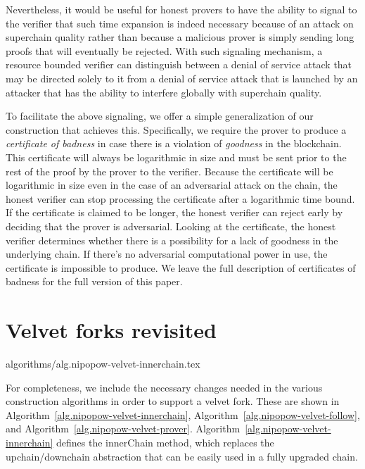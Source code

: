 %
Nevertheless, it would be useful for honest provers to have the ability to
signal to the verifier that such time expansion is indeed necessary because of
an attack on superchain quality rather than because a malicious prover is simply
sending long proofs that will eventually be rejected. With such signaling
mechanism, a resource bounded verifier can distinguish between a denial of
service attack that may be directed solely to it from  a denial of service
attack that  is launched by an attacker that has the ability to  interfere
globally with superchain quality.

To facilitate the above signaling, we offer a simple generalization of our
construction that achieves this.
Specifically, we require the prover to produce a \textit{certificate of badness}
in case there is a violation of \textit{goodness} in the blockchain. This
certificate will always be logarithmic in size and must be sent prior to the
rest of the proof by the prover to the verifier. Because the certificate will be
logarithmic in size even in the case of an adversarial attack on the chain, the
honest verifier can stop processing the certificate after a logarithmic time
bound. If the certificate is claimed to be longer, the honest verifier can
reject early by deciding that the prover is adversarial. Looking at the
certificate, the honest verifier determines whether there is a possibility for a
lack of goodness in the underlying chain. If there's no adversarial
computational power in use, the certificate is impossible to produce. We leave
the full description of certificates of badness for the full version of this
paper.

\section{Velvet forks revisited}

{algorithms/alg.nipopow-velvet-innerchain.tex}

For completeness, we include the necessary changes needed in the various
construction algorithms in order to support a velvet fork. These are shown in
Algorithm~\ref{alg.nipopow-velvet-innerchain},
Algorithm~\ref{alg.nipopow-velvet-follow}, and
Algorithm~\ref{alg.nipopow-velvet-prover}.
Algorithm~\ref{alg.nipopow-velvet-innerchain} defines the innerChain method,
which replaces the upchain/downchain abstraction that can be easily used in a
fully upgraded chain.


